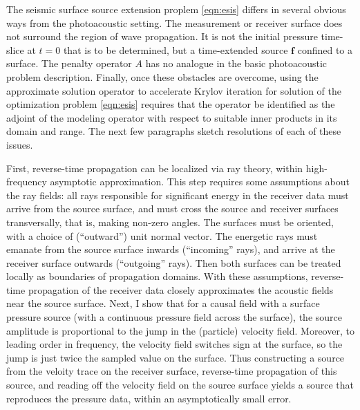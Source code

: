 \documentclass[georeport,12pt]{geophysics}
\newcommand{\bff}{\mathbf{f}}
\begin{document}
The seismic surface source extension proplem \ref{eqn:esis} differs in
several obvious ways from the photoacoustic setting. The measurement
or receiver surface does not surround the region of wave
propagation. It is not the initial pressure time-slice at $t=0$ that
is to be determined, but a time-extended source $\bff$ confined to a
surface. The penalty operator $A$ has no analogue in the basic
photoacoustic problem description. Finally, once these obstacles are
overcome, using the approximate solution operator to accelerate Krylov
iteration for solution of the optimization problem \ref{eqn:esis}
requires that the operator be identified as the adjoint of the
modeling operator with respect to suitable inner products in its
domain and range. The next few paragraphs sketch resolutions of each
of these issues.

First, reverse-time propagation can be localized via ray theory,
within high-frequency asymptotic approximation. This step requires
some assumptions about the ray fields: all rays responsible for
significant energy in the receiver data must arrive from the source
surface, and must cross the source and receiver surfaces
transversally, that is, making non-zero angles. The surfaces must be
oriented, with a choice of (``outward'') unit normal vector. The
energetic rays must emanate
from the source surface inwards (``incoming'' rays), and
arrive at the receiver surface outwards (``outgoing'' rays). Then both surfaces
can be treated locally as
boundaries of propagation domains. 
With these assumptions, reverse-time propagation of the receiver data
closely approximates the acoustic fields near the source
surface. Next, I show that for a causal field with a surface pressure source (with a
continuous pressure field across the surface), the source amplitude is
proportional to the jump in the (particle) velocity field. Moreover,
to leading order in frequency, the velocity field switches sign at the
surface, so the jump is just twice the sampled value on the
surface. Thus constructing a source from the veloity trace on the
receiver surface, reverse-time propagation of this source, and reading off the velocity
field on the source surface yields a source that reproduces the
pressure data, within an asymptotically small error.
\end{document}
